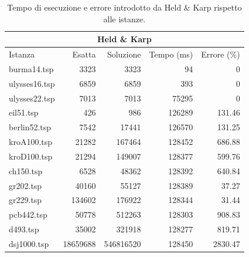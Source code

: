 \begin{table}[h]
    \centering

    \begin{tabular}{lrrrr}
    \toprule
    \multicolumn{5}{c}{Held \& Karp} \\
    \hline
     Istanza       &   Esatta &        Soluzione &   Tempo (ms) &   Errore (\%) \\
    \hline
    burma14.tsp   &     3323 &   3323           &          94 &        0    \\
    ulysses16.tsp &     6859 &   6859           &         393 &        0    \\
    ulysses22.tsp &     7013 &   7013           &       75295 &        0    \\
    eil51.tsp     &      426 &    986           &      126289 &      131.46 \\
    berlin52.tsp  &     7542 &  17441           &      126570 &      131.25 \\
    kroA100.tsp   &    21282 & 167464           &      128452 &      686.88 \\
    kroD100.tsp   &    21294 & 149007           &      128377 &      599.76 \\
    ch150.tsp     &     6528 &  48362           &      128392 &      640.84 \\
    gr202.tsp     &    40160 &  55127           &      128389 &       37.27 \\
    gr229.tsp     &   134602 & 176922           &      128344 &       31.44 \\
    pcb442.tsp    &    50778 & 512263           &      128303 &      908.83 \\
    d493.tsp      &    35002 & 321918           &      128277 &      819.71 \\
    dsj1000.tsp   & 18659688 &  546816520       &      128450 &     2830.47 \\
    \bottomrule
    \end{tabular}

    \caption{Tempo di esecuzione e errore introdotto da Held \& Karp rispetto alle istanze.}
    \label{table:held-karp-runtime-accuracy}
\end{table}

